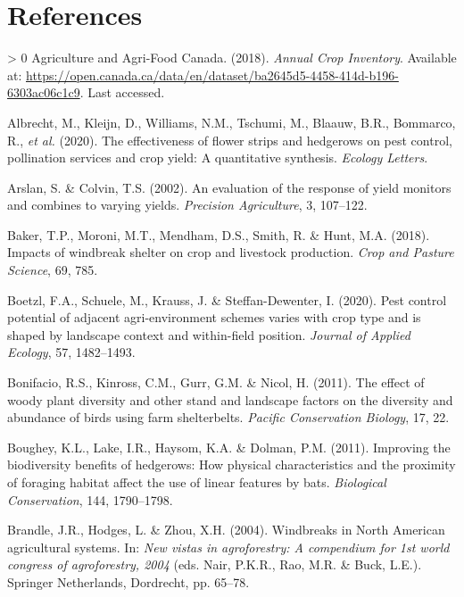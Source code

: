 \documentclass[]{elsarticle} %
\newlength{\cslhangindent}
\newenvironment{CSLReferences}[3] %
 {%
  \setlength{\parindent}{0pt}
  \ifodd #1 \everypar{\setlength{\hangindent}{\cslhangindent}}\ignorespaces\fi
  \ifnum #2 > 0
  \setlength{\parskip}{#2\baselineskip}
  \fi
 }%
 {}
\begin{document}
\hypertarget{references}{%
\section*{References}\label{references}}

\hypertarget{refs}{}
\begin{CSLReferences}{1}{0}
\leavevmode\hypertarget{ref-AAFC_data}{}%
Agriculture and Agri-Food Canada. (2018). \emph{{Annual Crop Inventory}}. Available at: \url{https://open.canada.ca/data/en/dataset/ba2645d5-4458-414d-b196-6303ac06c1c9}. Last accessed.

\leavevmode\hypertarget{ref-albrecht2020}{}%
Albrecht, M., Kleijn, D., Williams, N.M., Tschumi, M., Blaauw, B.R., Bommarco, R., \emph{et al.} (2020). The effectiveness of flower strips and hedgerows on pest control, pollination services and crop yield: A quantitative synthesis. \emph{Ecology Letters}.

\leavevmode\hypertarget{ref-arslan2002}{}%
Arslan, S. \& Colvin, T.S. (2002). An evaluation of the response of yield monitors and combines to varying yields. \emph{Precision Agriculture}, 3, 107--122.

\leavevmode\hypertarget{ref-baker2018}{}%
Baker, T.P., Moroni, M.T., Mendham, D.S., Smith, R. \& Hunt, M.A. (2018). Impacts of windbreak shelter on crop and livestock production. \emph{Crop and Pasture Science}, 69, 785.

\leavevmode\hypertarget{ref-boetzl2020}{}%
Boetzl, F.A., Schuele, M., Krauss, J. \& Steffan-Dewenter, I. (2020). Pest control potential of adjacent agri-environment schemes varies with crop type and is shaped by landscape context and within-field position. \emph{Journal of Applied Ecology}, 57, 1482--1493.

\leavevmode\hypertarget{ref-bonifacio2011}{}%
Bonifacio, R.S., Kinross, C.M., Gurr, G.M. \& Nicol, H. (2011). The effect of woody plant diversity and other stand and landscape factors on the diversity and abundance of birds using farm shelterbelts. \emph{Pacific Conservation Biology}, 17, 22.

\leavevmode\hypertarget{ref-boughey2011}{}%
Boughey, K.L., Lake, I.R., Haysom, K.A. \& Dolman, P.M. (2011). Improving the biodiversity benefits of hedgerows: How physical characteristics and the proximity of foraging habitat affect the use of linear features by bats. \emph{Biological Conservation}, 144, 1790--1798.

\leavevmode\hypertarget{ref-brandle2004}{}%
Brandle, J.R., Hodges, L. \& Zhou, X.H. (2004). Windbreaks in {North American} agricultural systems. In: \emph{New vistas in agroforestry: A compendium for 1st world congress of agroforestry, 2004} (eds. Nair, P.K.R., Rao, M.R. \& Buck, L.E.). Springer Netherlands, Dordrecht, pp. 65--78.


\end{CSLReferences}
\end{document}
